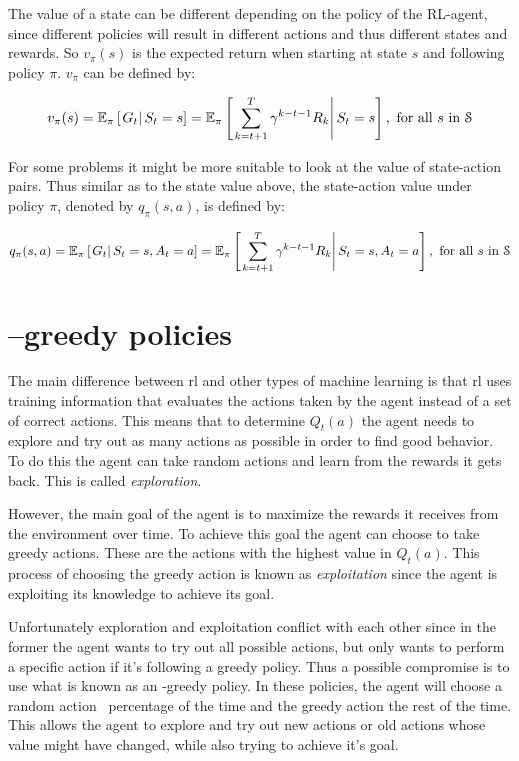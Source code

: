 The value of a state can be different depending on the policy of the RL-agent, since different policies will result in different actions and thus different states and rewards. So $v_\pi(s)$ is the expected return when starting at state $s$ and following policy $\pi$. $v_\pi$ can be defined by:

\begin{equation}
  v_\pi(s) = \mathbb{E}_\pi \left [ \left. G_t \right| S_t=s \right ] = \mathbb{E}_\pi \left [ \left. \sum_{k=t+1}^{T}\gamma^{k-t-1}R_{k} \right| S_t=s \right ], \textup{ for all } s \textup{ in } \mathcal{S}
  \label{eq:vpi}
\end{equation}

For some problems it might be more suitable to look at the value of state-action pairs. Thus similar as to the state value above, the state-action value under policy $\pi$, denoted by $q_\pi(s, a)$, is defined by:

\begin{equation}
  q_\pi(s, a) = \mathbb{E}_\pi \left [ \left. G_t \right| S_t=s, A_t=a \right ] = \mathbb{E}_\pi \left [ \left. \sum_{k=t+1}^{T}\gamma^{k-t-1}R_{k} \right| S_t=s, A_t=a  \right ], \textup{ for all } s \textup{ in } \mathcal{S}
  \label{eq:value_state_action_pair}
\end{equation}

\section{\texorpdfstring{\eps}---greedy policies}
\label{sec:epsgreedyexample}
The main difference between \acrlong{rl} and other types of machine learning is that \gls{rl} uses training information that evaluates the actions taken by the agent instead of a set of correct actions. This means that to determine $Q_t(a)$ the agent needs to explore and try out as many actions as possible in order to find good behavior. To do this the agent can take random actions and learn from the rewards it gets back. This is called \emph{exploration}.

However, the main goal of the agent is to maximize the rewards it receives from the environment over time. To achieve this goal the agent can choose to take greedy actions. These are the actions with the highest value in $Q_t(a)$. This process of choosing the greedy action is known as \emph{exploitation} since the agent is exploiting its knowledge to achieve its goal.

Unfortunately exploration and exploitation conflict with each other since in the former the agent wants to try out all possible actions, but only wants to perform a specific action if it's following a greedy policy. Thus a possible compromise is to use what is known as an \eps-greedy policy. In these policies, the agent will choose a random action \eps\ percentage of the time and the greedy action the rest of the time. This allows the agent to explore and try out new actions or old actions whose value might have changed, while also trying to achieve it's goal.

